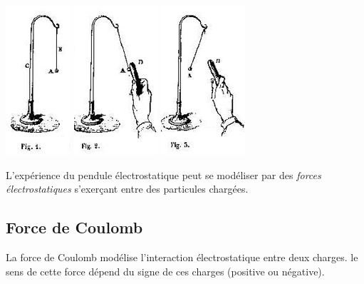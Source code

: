 \begin{center}
\includegraphics[scale=0.9]{./forces/Mascart01}
\hspace{0.3cm}
\includegraphics[scale=0.9]{./forces/Mascart02}
\hspace{0.3cm}
\includegraphics[scale=0.9]{./forces/Mascart03}
\end{center}

L'expérience du pendule électrostatique peut se modéliser par des {\it forces électrostatiques} s'exerçant entre des particules chargées.

\subsection{Force de Coulomb}
La force de Coulomb modélise l'interaction électrostatique entre deux charges. le sens de cette force dépend du signe de ces charges (positive ou négative).


